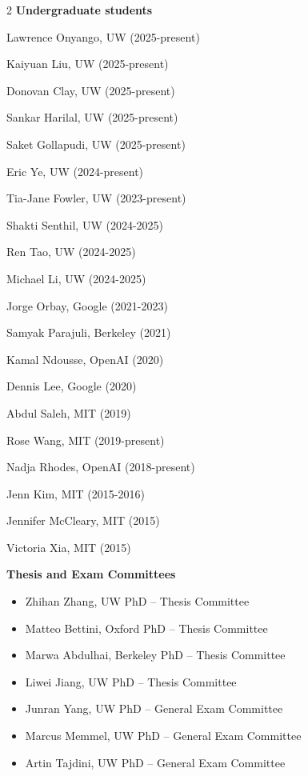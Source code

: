 \documentclass[paper=letter,fontsize=11pt]{scrartcl} %
\begin{document}
\begin{multicols}{2}
\noindent \textbf{Undergraduate students}
\begin{etaremune}
    \item Lawrence Onyango, UW (2025-present)
    \item Kaiyuan Liu, UW (2025-present)
    \item Donovan Clay, UW (2025-present)
    \item Sankar Harilal, UW (2025-present)
    \item Saket Gollapudi, UW (2025-present)
    \item Eric Ye, UW (2024-present)
    \item Tia-Jane Fowler, UW (2023-present)
    \item Shakti Senthil, UW (2024-2025)
    \item Ren Tao, UW (2024-2025)
    \item Michael Li, UW (2024-2025)
    \item Jorge Orbay, Google (2021-2023)
    \item Samyak Parajuli, Berkeley (2021)
    \item Kamal Ndousse, OpenAI (2020)
    \item Dennis Lee, Google (2020)
    \item Abdul Saleh, MIT (2019)
    \item Rose Wang, MIT (2019-present)
    \item Nadja Rhodes, OpenAI (2018-present)
    \item Jenn Kim, MIT (2015-2016)
    \item Jennifer McCleary, MIT (2015)
    \item Victoria Xia, MIT (2015)
\end{etaremune}
\end{multicols}


\noindent \textbf{Thesis and Exam Committees}
\begin{itemize}
    \item Zhihan Zhang, UW PhD -- Thesis Committee
    \item Matteo Bettini, Oxford PhD -- Thesis Committee
    \item Marwa Abdulhai, Berkeley PhD -- Thesis Committee
    \item Liwei Jiang, UW PhD -- Thesis Committee
    \item Junran Yang, UW PhD -- General Exam Committee
    \item Marcus Memmel, UW PhD -- General Exam Committee
    \item Artin Tajdini, UW PhD -- General Exam Committee
\end{itemize}
\end{document}
